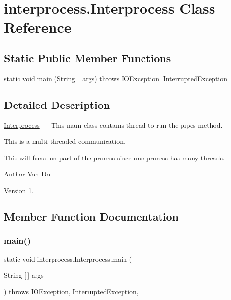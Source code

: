 \hypertarget{classinterprocess_1_1_interprocess}{}\section{interprocess.\+Interprocess Class Reference}
\label{classinterprocess_1_1_interprocess}
\subsection*{Static Public Member Functions}
\begin{DoxyCompactItemize}
\item 
static void \hyperlink{classinterprocess_1_1_interprocess_a62de3e766ef3c3c70e60feda45bd3557}{main} (String\mbox{[}$\,$\mbox{]} args)  throws I\+O\+Exception, Interrupted\+Exception      
\end{DoxyCompactItemize}


\subsection{Detailed Description}
\hyperlink{classinterprocess_1_1_interprocess}{Interprocess} --- This main class contains thread to run the pipes method. 

This is a multi-\/threaded communication.

This will focus on part of the process since one process has many threads. \begin{DoxyAuthor}{Author}
Van Do 
\end{DoxyAuthor}
\begin{DoxyVersion}{Version}
1. 
\end{DoxyVersion}


\subsection{Member Function Documentation}
\mbox{\label{classinterprocess_1_1_interprocess_a62de3e766ef3c3c70e60feda45bd3557}} 
\subsubsection{\texorpdfstring{main()}{main()}}
{\footnotesize\ttfamily static void interprocess.\+Interprocess.\+main (\begin{DoxyParamCaption}\item[{String \mbox{[}$\,$\mbox{]}}]{args }\end{DoxyParamCaption}) throws I\+O\+Exception, Interrupted\+Exception\hspace{0.3cm}{\ttfamily [inline]}, {\ttfamily [static]}}

